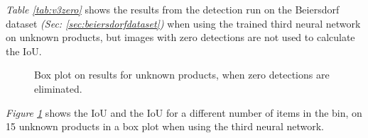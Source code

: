 \textit{Table \ref{tab:v3zero}} shows the results from the detection run on the Beiersdorf dataset \textit{(Sec: \ref{sec:beiersdorfdataset})} when using the trained third neural network on unknown products, but images with zero detections are not used to calculate the IoU. 

\begin{figure}[h]
 \centering
 \hfill
 \caption{Box plot on results for unknown products, when zero detections are eliminated.}
 \label{fig:v3zerofig}
\end{figure}

\textit{Figure \ref{fig:v3zerofig}} shows the IoU and the IoU for a different number of items in the bin, on 15 unknown products in a box plot when using the third neural network.

\clearpage

